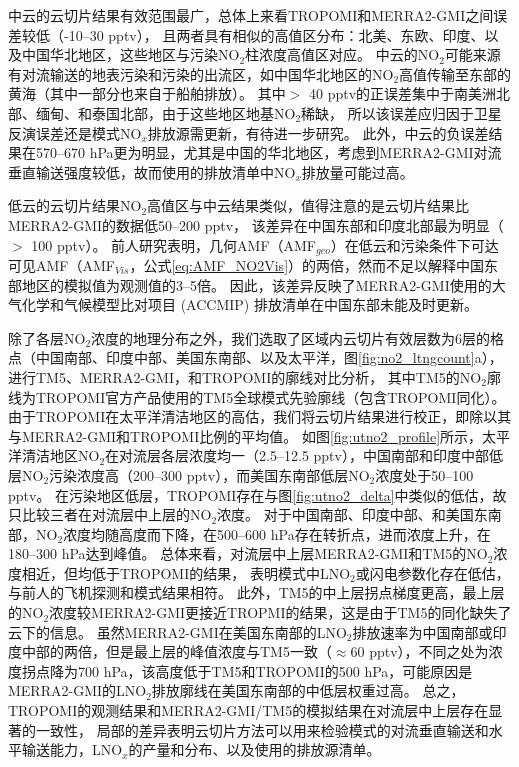 中云的云切片结果有效范围最广，总体上来看TROPOMI和MERRA2-GMI之间误差较低（-10--30 pptv），
且两者具有相似的高值区分布：北美、东欧、印度、以及中国华北地区，这些地区与污染NO$_2$柱浓度高值区对应。
中云的NO$_2$可能来源有对流输送的地表污染和污染的出流区，如中国华北地区的NO$_2$高值传输至东部的黄海（其中一部分也来自于船舶排放）。
其中$>$ 40 pptv的正误差集中于南美洲北部、缅甸、和泰国北部，由于这些地区地基NO$_2$稀缺，
所以该误差应归因于卫星反演误差还是模式NO$_x$排放源需更新，有待进一步研究。
此外，中云的负误差结果在570--670 hPa更为明显，尤其是中国的华北地区，考虑到MERRA2-GMI对流垂直输送强度较低，故而使用的排放清单中NO$_x$排放量可能过高\citep{Ziemke.2019}。

低云的云切片结果NO$_2$高值区与中云结果类似，值得注意的是云切片结果比MERRA2-GMI的数据低50--200 pptv，
该差异在中国东部和印度北部最为明显（$>$ 100 pptv）。
前人研究表明，几何AMF（AMF$_{geo}$）在低云和污染条件下可达可见AMF（AMF$_{Vis}$，公式\ref{eq:AMF_NO2Vis}）的两倍\citep{BelmonteRivas.2015}，然而不足以解释中国东部地区的模拟值为观测值的3--5倍。
因此，该差异反映了MERRA2-GMI使用的大气化学和气候模型比对项目 (ACCMIP) 排放清单在中国东部未能及时更新。

除了各层NO$_2$浓度的地理分布之外，我们选取了区域内云切片有效层数为6层的格点（中国南部、印度中部、美国东南部、以及太平洋，图\ref{fig:no2_ltngcount}a），
进行TM5、MERRA2-GMI，和TROPOMI的廓线对比分析，
其中TM5的NO$_2$廓线为TROPOMI官方产品使用的TM5全球模式先验廓线（包含TROPOMI同化）。
由于TROPOMI在太平洋清洁地区的高估，我们将云切片结果进行校正，即除以其与MERRA2-GMI和TROPOMI比例的平均值。
如图\ref{fig:utno2_profile}所示，太平洋清洁地区NO$_2$在对流层各层浓度均一（2.5--12.5 pptv），中国南部和印度中部低层NO$_2$污染浓度高（200--300 pptv），而美国东南部低层NO$_2$浓度处于50--100 pptv。
在污染地区低层，TROPOMI存在与图\ref{fig:utno2_delta}中类似的低估，故只比较三者在对流层中上层的NO$_2$浓度。
对于中国南部、印度中部、和美国东南部，NO$_2$浓度均随高度而下降，在500--600 hPa存在转折点，进而浓度上升，在180--300 hPa达到峰值。
总体来看，对流层中上层MERRA2-GMI和TM5的NO$_2$浓度相近，但均低于TROPOMI的结果，
表明模式中LNO$_2$或闪电参数化存在低估，与前人的飞机探测和模式结果相符\citep{Laughner.2019a,Zhang.2022a}。
此外，TM5的中上层拐点梯度更高，最上层的NO$_2$浓度较MERRA2-GMI更接近TROPMI的结果，这是由于TM5的同化缺失了云下的信息。
虽然MERRA2-GMI在美国东南部的LNO$_2$排放速率为中国南部或印度中部的两倍，但是最上层的峰值浓度与TM5一致（$\approx$60 pptv），不同之处为浓度拐点降为700 hPa，该高度低于TM5和TROPOMI的500 hPa，可能原因是MERRA2-GMI的LNO$_2$排放廓线在美国东南部的中低层权重过高。
总之，TROPOMI的观测结果和MERRA2-GMI/TM5的模拟结果在对流层中上层存在显著的一致性，
局部的差异表明云切片方法可以用来检验模式的对流垂直输送和水平输送能力，LNO$_x$的产量和分布、以及使用的排放源清单。



